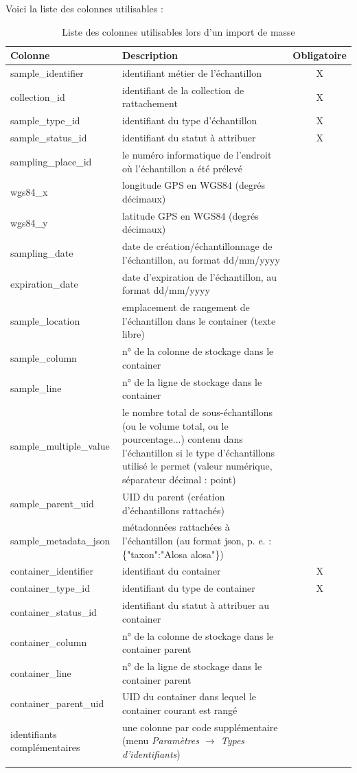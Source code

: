 Voici la liste des colonnes utilisables :
\begin{longtable}{|p{4cm}|p{8cm}| c|}
\hline
\textbf{Colonne} & \textbf{Description} & \textbf{Obligatoire} \\
\hline
\endhead
sample\_identifier & identifiant métier de l'échantillon & X \\
\hline
collection\_id & identifiant de la collection de rattachement & X \\
\hline
sample\_type\_id & identifiant du type d'échantillon & X \\
\hline
sample\_status\_id & identifiant du statut à attribuer & X \\
\hline
sampling\_place\_id & le numéro informatique de l'endroit où l'échantillon a été prélevé & \\
\hline
wgs84\_x & longitude GPS en WGS84 (degrés décimaux) & \\
\hline
wgs84\_y & latitude GPS en WGS84 (degrés décimaux) & \\
\hline
sampling\_date & date de création/échantillonnage de l'échantillon, au format dd/mm/yyyy & \\
\hline
expiration\_date & date d'expiration de l'échantillon, au format dd/mm/yyyy & \\
\hline
sample\_location & emplacement de rangement de l'échantillon dans le container (texte libre) & \\
\hline
sample\_column & n° de la colonne de stockage dans le container & \\
\hline
sample\_line & n° de la ligne de stockage dans le container & \\
\hline
sample\_multiple\_value & le nombre total de sous-échantillons (ou le volume total, ou le pourcentage...) contenu dans l'échantillon si le type d'échantillons utilisé le permet (valeur numérique, séparateur décimal : point) & \\
\hline
sample\_parent\_uid & UID du parent (création d'échantillons rattachés) &\\
\hline
sample\_metadata\_json & métadonnées rattachées à l'échantillon (au format json, p. e. : \{"taxon":"Alosa alosa"\}) & \\
\hline
container\_identifier & identifiant du container & X \\
\hline
container\_type\_id & identifiant du type de container & X \\
\hline
container\_status\_id & identifiant du statut à attribuer au container & \\
\hline
container\_column & n° de la colonne de stockage dans le container parent & \\
\hline
container\_line & n° de la ligne de stockage dans le container parent & \\
\hline
container\_parent\_uid & UID du container dans lequel le container courant est rangé & \\
\hline
identifiants complémentaires & une colonne par code supplémentaire (menu \textit{Paramètres $\rightarrow$ Types d'identifiants}) & \\
\hline

\caption{Liste des colonnes utilisables lors d'un import de masse}
\end{longtable}

